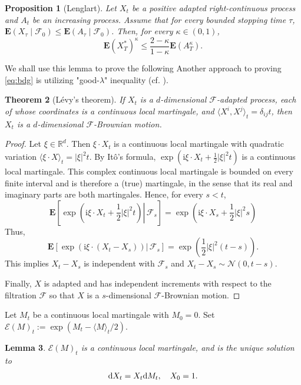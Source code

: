 \documentclass[twoside, 12pt]{book}
\numberwithin{equation}{chapter}
\newtheorem{theorem}{Theorem}[section]
\newtheorem{lemma}[theorem]{Lemma}
\newtheorem{proposition}[theorem]{Proposition}
\def\cF{{\mathcal F}}
\def\cN{{\mathcal N}}
\def\mR{{\mathbb R}}
\def\bE{{\mathbf E}}
\def\sE{{\mathscr E}}
\def\sF{{\mathscr F}}
\def\<{\langle}
\def\>{\rangle}
\def\leq{\leqslant}
\def\d{\text{\rm{d}}}
\def\i{\mathrm{i}}
\begin{document}
	\begin{proposition}[Lenglart]
		 Let $X_t$ be a positive adapted right-continuous process and $A_t$ be an increasing process. Assume that for every bounded stopping time $\tau$, $\mathbf{E} (X_\tau \mid \mathcal{F}_0 ) \leq \mathbf{E} (A_\tau \mid \mathcal{F}_0 )$. Then, for every $\kappa \in (0,1)$, 
		 $$
		     \mathbf{E} \left(X_T^* \right)^\kappa  \leq \frac{2-\kappa}{1-\kappa} \mathbf{E} \left( A_T^\kappa\right).
		 $$
	\end{proposition}
	
	We shall use this lemma to prove the following
	Another approach to proving \eqref{eq:bdg} is utilizing  "good-$\lambda$" inequality (cf. \cite{}).   
	\begin{theorem}[L\'evy's theorem]
		If $X_t$ is a $d$-dimensional $\sF$-adapted process, each of whose coordinates is a continuous local martingale, and $\langle X^i, X^j \rangle_t=\delta_{ij} t$, then $X_t$ is a $d$-dimensional $\sF$-Brownian motion.
	\end{theorem}
	\begin{proof}
		Let $\xi\in \mR^d$. Then $\xi\cdot X_t$ is a continuous local martingale with quadratic variation $\<\xi\cdot X\>_t= |\xi|^2 t$. By It\^o's formula, $\exp(\i\xi\cdot X_t+\frac{1}{2}|\xi|^2 t)$ is a continuous local martingale. This complex continuous local martingale is bounded on every finite interval and is therefore a (true) martingale, in the sense that its real and imaginary parts are
		both martingales. Hence, for every $s<t$, 
		$$
		    \bE\left[\left.\exp \left(\mathrm{i} \xi \cdot X_t+\frac{1}{2}|\xi|^2 t\right) \right\rvert\, {\cF}_s\right]=\exp \left(\mathrm{i} \xi \cdot X_s+\frac{1}{2}|\xi|^2 s\right)
		$$
		Thus, 
		$$
		    \bE\left[\left.\exp \left(\mathrm{i} \xi \cdot (X_t-X_s)\right) \right\rvert\, {\cF}_s\right]=\exp \left(\frac{1}{2}|\xi|^2 (t-s)\right). 
		$$
		This implies $X_t-X_s$ is independent with $\cF_s$ and $X_t-X_s\sim \cN(0, t-s)$. 
		
		Finally, $X$ is adapted and has independent
		increments with respect to the filtration $\sF$ so that $X$ is a $s$-dimensional $\sF$-Brownian motion. 
	\end{proof}
	
	Let $M_t$ be a continuous local martingale with $M_0=0$. Set $\sE(M)_t:= \exp(M_t-\langle M \rangle_t/2)$. 
	\begin{lemma}
		$\sE(M)_t$ is a continuous local martingale, and is the unique solution to 
		$$
		    \d X_t= X_t \d M_t, \quad X_0=1. 
		$$
	\end{lemma}
	
\end{document}
